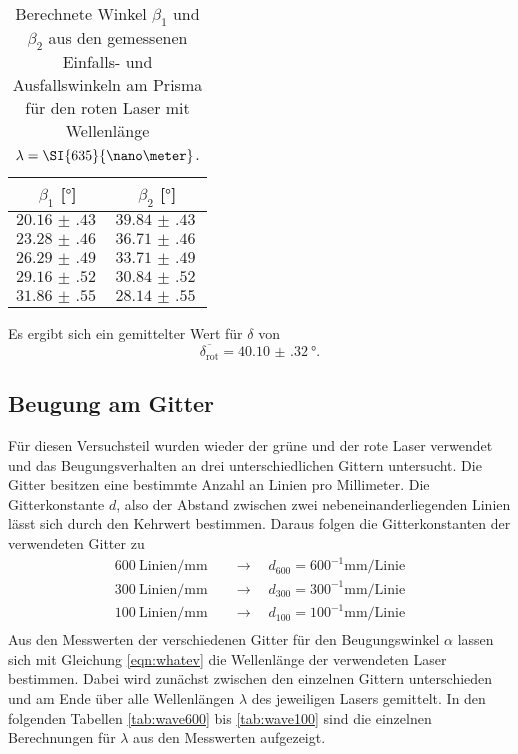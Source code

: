 \begin{table}
    \centering
    \caption{Berechnete Winkel $\beta_1$ und $\beta_2$ aus den gemessenen Einfalls- und Ausfallswinkeln am Prisma für den roten Laser mit Wellenlänge $\protect \lambda = \SI{635}{\nano\meter}$.}
    \label{tab:prismaredber}
    \begin{tabular}{c c}
        \toprule
        $\beta_1$ [$\si{\degree}$] & $\beta_2$ [$\si{\degree}$] \\
        \midrule
        $\SI{20.16(43)}{}$ & $\SI{39.84(43)}{}$\\
        $\SI{23.28(46)}{}$ & $\SI{36.71(46)}{}$\\  
        $\SI{26.29(49)}{}$ & $\SI{33.71(49)}{}$\\
        $\SI{29.16(52)}{}$ & $\SI{30.84(52)}{}$\\
        $\SI{31.86(55)}{}$ & $\SI{28.14(55)}{}$\\
        \bottomrule    
    \end{tabular}
\end{table}
Es ergibt sich ein gemittelter Wert für $\delta$ von
\begin{equation}
\overline{\delta_{\text{rot}}} = \SI{40.10(32)}{\degree}.
\end{equation}

\subsection{Beugung am Gitter}
Für diesen Versuchsteil wurden wieder der grüne und der rote Laser verwendet und das Beugungsverhalten an drei unterschiedlichen Gittern untersucht. Die Gitter besitzen
eine bestimmte Anzahl an Linien pro Millimeter. Die Gitterkonstante $d$, also der Abstand zwischen zwei nebeneinanderliegenden Linien lässt sich durch den Kehrwert bestimmen. 
Daraus folgen die Gitterkonstanten der verwendeten Gitter zu
\begin{align*}
\SI{600}{{\text{Linien}}\per\milli\meter} \quad &\to \quad d_{600} = {600^{-1}}\si{\milli\meter\per{\text{Linie}}} \\
\SI{300}{{\text{Linien}}\per\milli\meter} \quad &\to \quad d_{300} = {300^{-1}}\si{\milli\meter\per{\text{Linie}}} \\
\SI{100}{{\text{Linien}}\per\milli\meter} \quad &\to \quad d_{100} = {100^{-1}}\si{\milli\meter\per{\text{Linie}}} \\
\end{align*}
Aus den Messwerten der verschiedenen Gitter für den Beugungswinkel $\alpha$ lassen sich mit Gleichung \ref{eqn:whatev} die Wellenlänge der verwendeten Laser bestimmen.
Dabei wird zunächst zwischen den einzelnen Gittern unterschieden und am Ende über alle Wellenlängen $\lambda$ des jeweiligen Lasers gemittelt.
In den folgenden Tabellen \ref{tab:wave600} bis \ref{tab:wave100} sind die einzelnen Berechnungen für $\lambda$ aus den Messwerten aufgezeigt.

